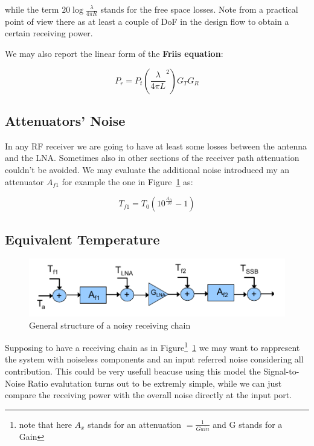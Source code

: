 while the term $20\log{ \frac{\lambda}{4 \pi R} }$ stands for the free space losses.
Note from a practical point of view there as at least a couple of DoF in the design flow to obtain a certain receiving power.

We may also report the linear form of the \textbf{Friis equation}:

\begin{equation}
P_r = P_t  \left( \frac { \lambda } {4 \pi L}^2 \right) G_T G_R
\end{equation}




\subsection{Attenuators' Noise} %
\label{sub:noise_of_attenuators}

In any RF receiver we are going to have at least some losses between the antenna and the LNA. Sometimes also in other sections of the receiver path attenuation couldn't be avoided.
We may evaluate the additional noise introduced my an attenuator $A_{f1}$ for example the one in Figure~\ref{fig:Teq} as:

\begin{equation}
	T_{f1} = T_0 (10^{ \frac {A_{f1}} {10} }-1)
\end{equation}




\subsection{Equivalent Temperature} %
\label{sub:equivalent_temperature}

\begin{figure} [h!]
	\centering
	\includegraphics[scale=1]{Immagini/Teq}
	
	\caption{General structure of a noisy receiving chain}
	\label{fig:Teq}
\end{figure}


Supposing to have a receiving chain as in Figure\footnote{note that here $A_x$ stands for an attenuation $= \frac{1}{Gain}$ and G stands for a Gain}~\ref{fig:Teq} we may want to rappresent the system with noiseless components and an input referred noise considering all contribution.
This could be very usefull beacuse using this model the Signal-to-Noise Ratio evalutation turns out to be extremly simple, while we can just compare the receiving power with the overall noise directly at the input port.

